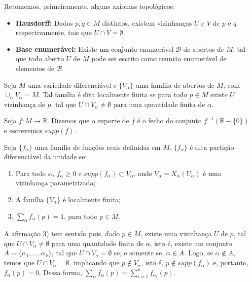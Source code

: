 Retomemos, primeiramente, alguns axiomas topológicos:
\begin{axiom}
    \label{loc:axiomas_sobre_topologia_das_variedades}
    \begin{itemize}
        \item \textbf{Hausdorff:} Dados $p,q \in M$ distintos, existem vizinhanças $U$ e $V$ de $p$ e $q$ respectivamente, tais que $U\cap V=\emptyset$.
        \item \textbf{Base enumerável:} Existe um conjunto enumerável $\mathcal{B}$ de abertos de $M$, tal que todo aberto $U$ de $M$ pode ser escrito como reunião enumerável de elementos de $\mathcal{B}$.
    \end{itemize}
\end{axiom}
\begin{definition}
    \label{loc:def_10_:_familia_localmente_finita_suporte_partição_da_unidade.família_localmente_finita}
    Seja $M$ uma variedade diferenciável e $\{ V_{\alpha} \}$ uma família de abertos de $M$, com $\cup_{\alpha}V_{\alpha}=M$. Tal família é dita localmente finita se para todo $p \in M$ existe $U$ vizinhança de $p$, tal que $U\cap V_{\alpha}\neq \emptyset$ para uma quantidade finita de $\alpha$.
\end{definition}
\begin{definition}
    \label{loc:def_10_:_familia_localmente_finita_suporte_partição_da_unidade.suporte}
    Seja $f:M\to \mathbb{R}$. Dizemos que o suporte de $f$ é o fecho do conjunto $f^{-1}(\mathbb{R}-\{ 0 \})$ e escrevemos $supp(f)$.
\end{definition}
\begin{definition}
    \label{loc:def_10_:_familia_localmente_finita_suporte_partição_da_unidade.partição_da_unidade}
    Seja $\{ f_{\alpha} \}$ uma família de funções reais definidas em $M$. $\{ f_{\alpha} \}$ é dita partição diferenciável da unidade se:
    \begin{enumerate}
        \item Para todo $\alpha$, $f_{\alpha}\geq0$ e $supp(f_{\alpha})\subset V_{\alpha}$, onde $V_{\alpha}=X_{\alpha}(U_{\alpha})$ é uma vizinhança parametrizada;
        \item A família $\{ V_{\alpha} \}$ é localmente finita;
        \item $\sum_{\alpha}f_{\alpha}(p)=1$, para todo $p \in M$.
    \end{enumerate}

    A afirmação 3) tem sentido pois, dado $p \in M$, existe uma vizinhança $U$ de $p$, tal que $U\cap V_{\alpha}\neq \emptyset$ para uma quantidade finita de $\alpha$, isto é, existe um conjunto $A=\{ \alpha_{1}, \dots, \alpha _{k} \}$, tal que $U\cap V_{\alpha}=\emptyset$ se, e somente se, $\alpha \in A$. Logo, se $\alpha \not\in A$, temos que $U\cap V_{\alpha}=\emptyset$, implicando que $p \not\in V_{\alpha}$, isto é, $p \not\in supp(f_{\alpha})$ e, portanto, $f_{\alpha}(p)=0$. Dessa forma, $\sum_{\alpha}f_{\alpha}(p)=\sum_{i=1}^{k}f_{\alpha_{i}}(p)$.
\end{definition}
